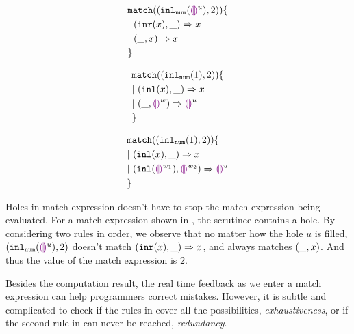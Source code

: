 \documentclass[acmsmall,screen,review,nonacm]{acmart}
\theoremstyle{slplain}
\numberwithin{thm}{section}
\begin{document}
\begin{figure}[h]
\begin{minipage}{0.33\textwidth}
\begin{equation}
\begin{split}
  &\mathtt{match} ((\mathtt{inl}_{\mathtt{num}}({\textcolor{violet}{\llparenthesis}\textcolor{violet}{\rrparenthesis}^{u}}) , 2)) \{\\
  &|~ (\mathtt{inr}(x) , \_) \Rightarrow x \\
  &|~ (\_ , x) \Rightarrow x \\
  &\}
\end{split}
\label{eq:complete}
\end{equation}
\end{minipage}%
\begin{minipage}{0.33\textwidth}
\begin{equation}
\begin{split}
  &\mathtt{match} ((\mathtt{inl}_{\mathtt{num}}({1}) , 2)) \{\\
  &|~ (\mathtt{inl}(x) , \_) \Rightarrow x \\
  &|~ (\_ , \textcolor{violet}{\llparenthesis}\textcolor{violet}{\rrparenthesis}^{w}) \Rightarrow \textcolor{violet}{\llparenthesis}\textcolor{violet}{\rrparenthesis}^{u} \\
  &\}
\end{split}
\label{eq:pathole-exhaustive}
\end{equation}
\end{minipage}%
\begin{minipage}{0.33\textwidth}
\begin{equation}
\begin{split}
  &\mathtt{match} ((\mathtt{inl}_{\mathtt{num}}({1}) , 2)) \{\\
  &|~ (\mathtt{inl}(x) , \_) \Rightarrow x \\
  &|~ (\mathtt{inl}(\textcolor{violet}{\llparenthesis}\textcolor{violet}{\rrparenthesis}^{w_1}) , \textcolor{violet}{\llparenthesis}\textcolor{violet}{\rrparenthesis}^{w_2}) \Rightarrow \textcolor{violet}{\llparenthesis}\textcolor{violet}{\rrparenthesis}^{u} \\
  &\}
\end{split}
\label{eq:pathole-redundant}
\end{equation}
\end{minipage}%
\end{figure}

Holes in match expression doesn't have to stop the match expression being evaluated.
For a match expression shown in , the scrutinee contains a hole.
By considering two rules in order, we observe that
no matter how the hole $u$ is filled, $(\mathtt{inl}_{\mathtt{num}}({\textcolor{violet}{\llparenthesis}\textcolor{violet}{\rrparenthesis}^{u}}) , 2)$ doesn't match $(\mathtt{inr}(x) , \_) \Rightarrow x$,
and always matches $(\_ , x)$. And thus the value of the match expression is $2$.

Besides the computation result, the real time feedback as we enter a match expression can help programmers correct mistakes.
However, it is subtle and complicated to check if the rules in  cover all the possibilities, \ie \emph{exhaustiveness}, or if the second rule in  can never be reached, \ie \emph{redundancy}. 
\end{document}
